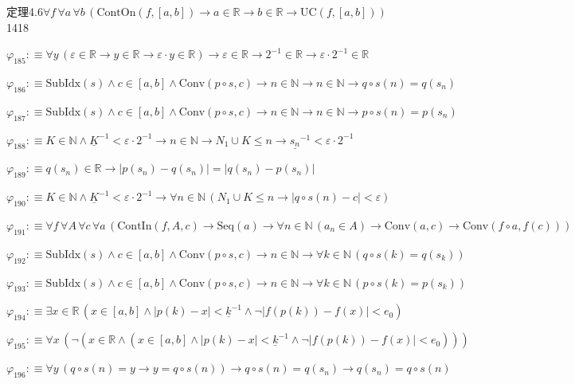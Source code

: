 \begin{fullproof}{定理4.6}{$\forall f\,\forall a\,\forall b\,(\mathrm{ContOn}(f,[a,b]) \to a \in \mathbb{R} \to b \in \mathbb{R} \to \mathrm{UC}(f,[a,b]))$}{1418}
\begin{abbrevlist}
\item $\varphi_{185} :\equiv \forall y\,(\varepsilon \in \mathbb{R} \to y \in \mathbb{R} \to \varepsilon \cdot y \in \mathbb{R}) \to \varepsilon \in \mathbb{R} \to 2^{-1} \in \mathbb{R} \to \varepsilon \cdot 2^{-1} \in \mathbb{R}$
\item $\varphi_{186} :\equiv \mathrm{SubIdx}(s) \land c \in [a,b] \land \mathrm{Conv}(p \circ s,c) \to n \in \mathbb{N} \to n \in \mathbb{N} \to q \circ s(n) = q(s_{n})$
\item $\varphi_{187} :\equiv \mathrm{SubIdx}(s) \land c \in [a,b] \land \mathrm{Conv}(p \circ s,c) \to n \in \mathbb{N} \to n \in \mathbb{N} \to p \circ s(n) = p(s_{n})$
\item $\varphi_{188} :\equiv K \in \mathbb{N} \land \underline{K}^{-1} < \varepsilon \cdot 2^{-1} \to n \in \mathbb{N} \to N_{1} \cup K \leq n \to \underline{s_{n}}^{-1} < \varepsilon \cdot 2^{-1}$
\item $\varphi_{189} :\equiv q(s_{n}) \in \mathbb{R} \to \lvert p(s_{n}) - q(s_{n}) \rvert = \lvert q(s_{n}) - p(s_{n}) \rvert$
\item $\varphi_{190} :\equiv K \in \mathbb{N} \land \underline{K}^{-1} < \varepsilon \cdot 2^{-1} \to \forall n \in \mathbb{N}\,(N_{1} \cup K \leq n \to \lvert q \circ s(n) - c \rvert < \varepsilon)$
\item $\varphi_{191} :\equiv \forall f\,\forall A\,\forall c\,\forall a\,(\mathrm{ContIn}(f,A,c) \to \mathrm{Seq}(a) \to \forall n \in \mathbb{N}\,(a_{n} \in A) \to \mathrm{Conv}(a,c) \to \mathrm{Conv}(f \circ a,f(c)))$
\item $\varphi_{192} :\equiv \mathrm{SubIdx}(s) \land c \in [a,b] \land \mathrm{Conv}(p \circ s,c) \to n \in \mathbb{N} \to \forall k \in \mathbb{N}\,(q \circ s(k) = q(s_{k}))$
\item $\varphi_{193} :\equiv \mathrm{SubIdx}(s) \land c \in [a,b] \land \mathrm{Conv}(p \circ s,c) \to n \in \mathbb{N} \to \forall k \in \mathbb{N}\,(p \circ s(k) = p(s_{k}))$
\item $\varphi_{194} :\equiv \exists x \in \mathbb{R}\,(x \in [a,b] \land \lvert p(k) - x \rvert < \underline{k}^{-1} \land \neg \lvert f(p(k)) - f(x) \rvert < e_{0})$
\item $\varphi_{195} :\equiv \forall x\,(\neg (x \in \mathbb{R} \land (x \in [a,b] \land \lvert p(k) - x \rvert < \underline{k}^{-1} \land \neg \lvert f(p(k)) - f(x) \rvert < e_{0})))$
\item $\varphi_{196} :\equiv \forall y\,(q \circ s(n) = y \to y = q \circ s(n)) \to q \circ s(n) = q(s_{n}) \to q(s_{n}) = q \circ s(n)$

\end{abbrevlist}
\end{fullproof}
